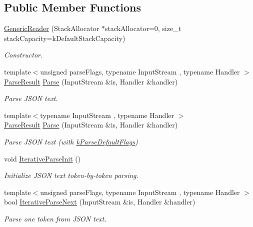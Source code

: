 \subsection*{Public Member Functions}
\begin{DoxyCompactItemize}
\item 
\hyperlink{a02220_aab875a34b3092df9fb4e2b8eac6dbb96}{Generic\+Reader} (Stack\+Allocator $\ast$stack\+Allocator=0, size\+\_\+t stack\+Capacity=k\+Default\+Stack\+Capacity)
\begin{DoxyCompactList}\small\item\em Constructor. \end{DoxyCompactList}\item 
{\footnotesize template$<$unsigned parse\+Flags, typename Input\+Stream , typename Handler $>$ }\\\hyperlink{a02188}{Parse\+Result} \hyperlink{a02220_a0c450620d14ff1824e58bb7bd9b42099}{Parse} (Input\+Stream \&is, Handler \&handler)
\begin{DoxyCompactList}\small\item\em Parse J\+S\+ON text. \end{DoxyCompactList}\item 
{\footnotesize template$<$typename Input\+Stream , typename Handler $>$ }\\\hyperlink{a02188}{Parse\+Result} \hyperlink{a02220_a76d91e5fd8dfe48aea7dd6d8a51dd6dc}{Parse} (Input\+Stream \&is, Handler \&handler)
\begin{DoxyCompactList}\small\item\em Parse J\+S\+ON text (with \hyperlink{a00563_ab7be7dabe6ffcba60fad441505583450a9104b0946d648e9467cb7a967401ec80}{k\+Parse\+Default\+Flags}) \end{DoxyCompactList}\item 
\mbox{\label{a02220_a7de472eda2ad9de13cfd8c1de74f1754}} 
void \hyperlink{a02220_a7de472eda2ad9de13cfd8c1de74f1754}{Iterative\+Parse\+Init} ()
\begin{DoxyCompactList}\small\item\em Initialize J\+S\+ON text token-\/by-\/token parsing. \end{DoxyCompactList}\item 
{\footnotesize template$<$unsigned parse\+Flags, typename Input\+Stream , typename Handler $>$ }\\bool \hyperlink{a02220_a257891331e0c259903e7066fb4cebf92}{Iterative\+Parse\+Next} (Input\+Stream \&is, Handler \&handler)
\begin{DoxyCompactList}\small\item\em Parse one token from J\+S\+ON text. \end{DoxyCompactList}\item 

\end{DoxyCompactItemize}
